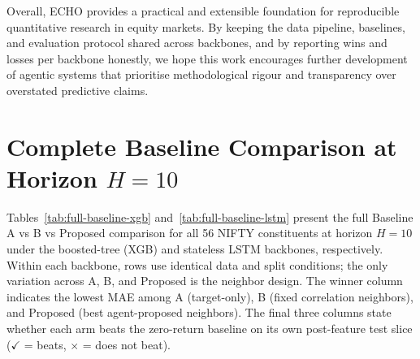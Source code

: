 \documentclass[12pt,a4paper,titlepage]{article}
\begin{document}
Overall, ECHO provides a practical and extensible foundation for reproducible quantitative research in equity markets. By keeping the data pipeline, baselines, and evaluation protocol shared across backbones, and by reporting wins and losses per backbone honestly, we hope this work encourages further development of agentic systems that prioritise methodological rigour and transparency over overstated predictive claims.

\clearpage
\appendix

\section{Complete Baseline Comparison at Horizon \(H=10\)}

Tables~\ref{tab:full-baseline-xgb} and~\ref{tab:full-baseline-lstm} present the full Baseline A vs B vs Proposed comparison for all 56 NIFTY constituents at horizon $H=10$ under the boosted-tree (XGB) and stateless LSTM backbones, respectively. Within each backbone, rows use identical data and split conditions; the only variation across A, B, and Proposed is the neighbor design. The winner column indicates the lowest MAE among A (target-only), B (fixed correlation neighbors), and Proposed (best agent-proposed neighbors). The final three columns state whether each arm beats the zero-return baseline on its own post-feature test slice ($\checkmark$ = beats, $\times$ = does not beat).

\begin{table}[htbp]
\centering
\scriptsize
\caption{Boosted trees (XGB): complete Baseline A vs B vs Proposed at $H=10$ for all 56 constituents. MAE is reported as a percentage of cumulative $10$-day return error. $\checkmark$ = beats zero baseline on that arm's final test rows.}
\label{tab:full-baseline-xgb}
\end{table}

\begin{table}[htbp]
\centering
\scriptsize
\caption{Stateless LSTM: complete Baseline A vs B vs Proposed at $H=10$ for all 56 constituents. MAE is reported as a percentage of cumulative $10$-day return error. $\checkmark$ = beats zero baseline on that arm's final test rows.}
\label{tab:full-baseline-lstm}
\end{table}
\end{document}
